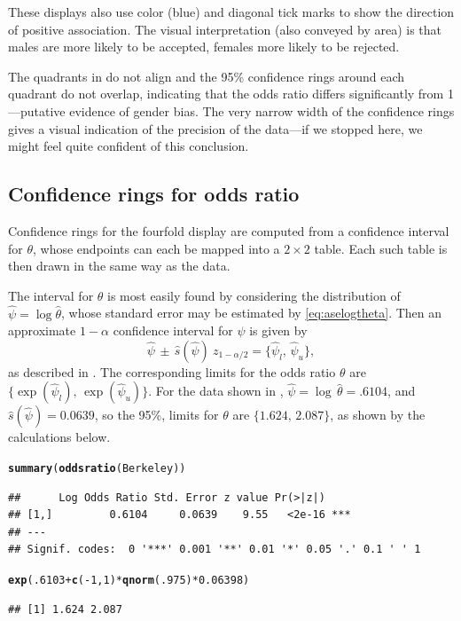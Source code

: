 \documentclass[11pt]{book}\usepackage[]{graphicx}\usepackage[]{color}
\makeatletter
\newcommand{\hlnum}[1]{\textcolor[rgb]{0.686,0.059,0.569}{#1}}%
\newcommand{\hlopt}[1]{\textcolor[rgb]{0,0,0}{#1}}%
\newcommand{\hlstd}[1]{\textcolor[rgb]{0.345,0.345,0.345}{#1}}%
\newcommand{\hlkwd}[1]{\textcolor[rgb]{0.737,0.353,0.396}{\textbf{#1}}}%
\newenvironment{kframe}{%
 \def\at@end@of@kframe{}%
 \ifinner\ifhmode%
  \def\at@end@of@kframe{\end{minipage}}%
  \begin{minipage}{\columnwidth}%
 \fi\fi%
 \def\FrameCommand##1{\hskip\@totalleftmargin \hskip-\fboxsep
 \colorbox{shadecolor}{##1}\hskip-\fboxsep
     \hskip-\linewidth \hskip-\@totalleftmargin \hskip\columnwidth}%
 \MakeFramed {\advance\hsize-\width
   \@totalleftmargin\z@ \linewidth\hsize
   \@setminipage}}%
 {\par\unskip\endMakeFramed%
 \at@end@of@kframe}
\newenvironment{knitrout}{}{} %
\renewenvironment{knitrout}{\small\renewcommand{\baselinestretch}{.85}}{} %
\makeatother
\begin{document}
These displays also use color (blue) and diagonal tick marks
to show the direction of positive association. The visual interpretation
(also conveyed by area) is that males are more likely to be accepted,
females more likely to be rejected.

The quadrants in  do not align and
the 95\% confidence rings around each quadrant do not overlap,
indicating that the odds ratio differs significantly from 1---putative
evidence of gender bias.  The very narrow
width of the confidence rings gives a visual indication of the
precision of the data---if we stopped here, we might feel quite confident of this conclusion.

\subsection{Confidence rings for odds ratio}
Confidence rings for the fourfold display are computed from a
confidence interval for \(\theta\), whose endpoints can each be
mapped into a \(2 \times  2\) table.  Each such table is then drawn
in the same way as the data.

The interval for \(\theta\) is most easily found by considering the
distribution of \(\hat{\psi}  =  \log  \hat{\theta} \), whose standard
error may be estimated by \eqref{eq:aselogtheta}.  Then an approximate \(1  -  \alpha\) confidence
interval for \(\psi\) is given by
\begin{equation*}
 \hat{\psi} \,\pm\,  \hat{s} ( \hat{\psi} )  \:
z_{ 1 - \alpha  / 2 } =  \{ \hat{\psi}_l , \,  \hat{\psi}_u \} 
 \comma
\end{equation*}
as described in .
The
corresponding limits for the odds ratio \(\theta\) are 
\(\{ \exp ( \hat{\psi}_l ) , \,  \exp ( \hat{\psi}_u ) \}\).  For the data
shown in , 
\(\hat{\psi}  =  \log \,  \hat{\theta} =  .6104\), 
and \(\hat{s}  ( \hat{\psi} )  =  0.0639\), so the 95\%,
limits for \(\theta\) are \(\{ 1.624, \,  2.087 \}\),
as shown by the calculations below.
\begin{knitrout}
\color{fgcolor}\begin{kframe}
\begin{alltt}
\hlkwd{summary}\hlstd{(}\hlkwd{oddsratio}\hlstd{(Berkeley))}
\end{alltt}
\begin{verbatim}
##      Log Odds Ratio Std. Error z value Pr(>|z|)    
## [1,]         0.6104     0.0639    9.55   <2e-16 ***
## ---
## Signif. codes:  0 '***' 0.001 '**' 0.01 '*' 0.05 '.' 0.1 ' ' 1
\end{verbatim}
\begin{alltt}
\hlkwd{exp}\hlstd{(}\hlnum{.6103} \hlopt{+} \hlkwd{c}\hlstd{(}\hlopt{-}\hlnum{1}\hlstd{,} \hlnum{1}\hlstd{)} \hlopt{*} \hlkwd{qnorm}\hlstd{(}\hlnum{.975}\hlstd{)} \hlopt{*} \hlnum{0.06398}\hlstd{)}
\end{alltt}
\begin{verbatim}
## [1] 1.624 2.087
\end{verbatim}
\end{kframe}
\end{knitrout}
\end{document}
